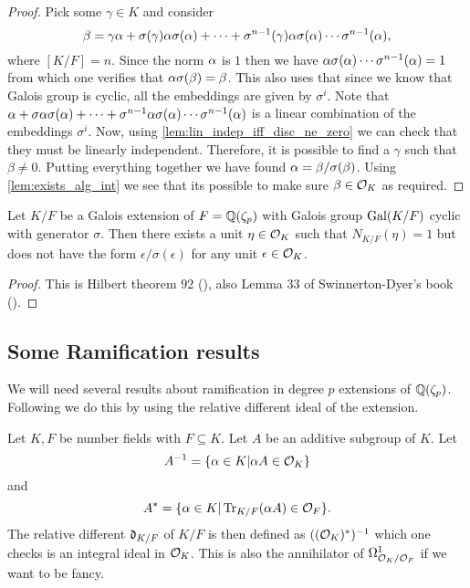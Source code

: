 \begin{proof}
  Pick some $\gamma \in K$ and consider \[\beta=\gamma \alpha+ \sigma(\gamma)\alpha \sigma(\alpha)+\cdots+\sigma^{n-1}(\gamma)\alpha \sigma(\alpha)\cdots \sigma^{n-1}(\alpha),\] where $[K/F]=n$. Since the norm $\alpha$ is $1$ then we have $\alpha \sigma(\alpha)\cdots \sigma^{n-1}(\alpha)=1$ from which one verifies that $\alpha \sigma(\beta)=\beta$. This also uses that since we know that Galois group is cyclic, all the embeddings are given by $\sigma^i$. Note that $ \alpha+ \sigma\alpha \sigma(\alpha)+\cdots+\sigma^{n-1}\alpha \sigma(\alpha)\cdots \sigma^{n-1}(\alpha)$ is a linear combination of the embeddings $\sigma^i$. Now, using \ref{lem:lin_indep_iff_disc_ne_zero} we can check that they must be linearly independent. Therefore, it is possible to find a $\gamma$ such that $\beta \neq 0$. Putting everything together we have found $\alpha=\beta/\sigma(\beta)$. Using \ref{lem:exists_alg_int} we see that its possible to make sure $\beta \in \mathcal{O}_K$ as required.




\end{proof}


\begin{theorem}[Hilbert 92]\label{lem:Hilbert92}
	Let $K/F$ be a Galois extension of $F=\mathbb{Q}(\zeta_p)$ with  Galois group $\operatorname{Gal}(K/F)$ cyclic with generator $\sigma$. Then there exists a unit $\eta \in \mathcal{O}_K$ such that $N_{K/F}(\eta)=1$ but does not have the form $\epsilon/\sigma(\epsilon)$ for any unit $\epsilon \in \mathcal{O}_K$.

\end{theorem}

\begin{proof}
This is Hilbert theorem 92 (\cite{Hilbert}), also Lemma 33 of Swinnerton-Dyer's book (\cite{SD}).



\end{proof}


\subsection{Some Ramification results}

We will need several results about ramification in degree $p$ extensions of $\mathbb{Q}(\zeta_p)$. Following \cite{SD} we do this by using the relative different ideal of the extension.

\begin{definition}\label{def:rel_different}

    Let $K, F$ be number fields with $F \subseteq K$. Let  $A$ be an additive subgroup of $K$. Let \[A^{-1}=\{ \alpha \in K | \alpha A \in \mathcal{O}_K\}\] and
    \[A^* = \{ \alpha \in K | \operatorname{Tr}_{K/F} (\alpha A) \in \mathcal{O}_F\}.\] The relative different $\mathfrak{d}_{K/F}$ of $K/F$ is then defined as $((\mathcal{O}_K)^*)^{-1}$ which one checks is an integral ideal in $\mathcal{O}_K$. This is also the annihilator of $\Omega^1_{\mathcal{O}_K/\mathcal{O}_F}$ if we want to be fancy.
\end{definition}


